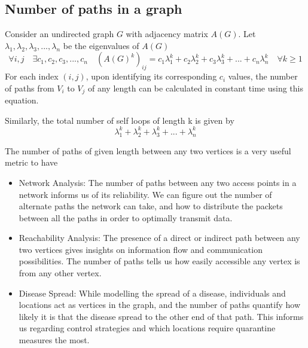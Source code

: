 \documentclass[12pt, a4paper]{article}
\begin{document}
    \subsection{Number of paths in a graph}
    \begin{flushleft}
    Consider an undirected graph $G$ with adjacency matrix $A(G)$. Let $\lambda_1,\lambda_2,\lambda_3,...,\lambda_n$ be the eigenvalues of $A(G)$
      $$\forall i,j \quad \exists c_1,c_2,c_3,...,c_n \quad (A(G)^k)_{ij} = c_1\lambda_1^k + c_2\lambda_2^k + c_3\lambda_3^k + ... + c_n\lambda_n^k \quad \forall k \ge 1$$
      For each index $(i, j)$, upon identifying its corresponding $c_i$ values, the number of paths from $V_i$ to $V_j$ of any length can be calculated in constant time using this equation.

      Similarly, the total number of self loops of length k is given by
      $$\lambda_1^k + \lambda_2^k + \lambda_3^k + ... + \lambda_n^k$$

      The number of paths of given length between any two vertices is a very useful metric to have
      \begin{itemize}
        \item Network Analysis: The number of paths between any two access points in a network informs us of its reliability. We can figure out the number of alternate paths the network can take, and how to distribute the packets between all the paths in order to optimally transmit data.

        \item Reachability Analysis: The presence of a direct or indirect path between any two vertices gives insights on information flow and communication possibilities. The number of paths tells us how easily accessible any vertex is from any other vertex.

        \item Disease Spread: While modelling the spread of a disease, individuals and locations act as vertices in the graph, and the number of paths quantify how likely it is that the disease spread to the other end of that path. This informs us regarding control strategies and which locations require quarantine measures the most.
      \end{itemize}
    \end{flushleft} 
\end{document}
